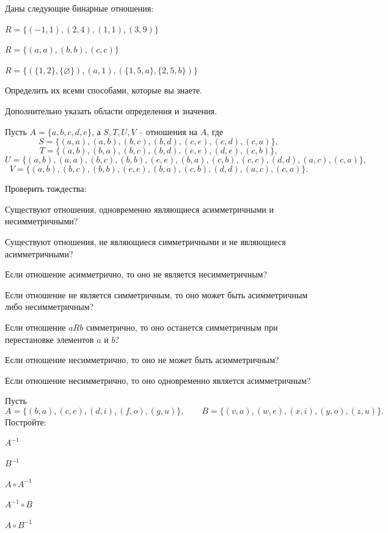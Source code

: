 \documentclass[a4paper,12pt,oneside]{article}
\begin{document}

Даны следующие бинарные отношения:
\begin{numlist}
    \item $R=\{(-1,1),(2,4),(1,1),(3,9)\}$
    \item $R=\{(a,a),(b,b),(c,c)\}$
    \item $R=\bigl\{(\{1,2\},\{\varnothing\}),(a,1),(\{1,5,a\},\{2,5,b\})\bigr\}$
\end{numlist}
Определить их всеми способами, которые вы знаете.

Дополнительно указать области определения и значения.

Пусть $A=\{a,b,c,d,e\}$, а $S,T,U,V$ – отношения на $A$, где
\[
S=\{(a,a),(a,b),(b,c),(b,d),(c,e),(e,d),(c,a)\},
\]
\[
T=\{(a,b),(b,a),(b,c),(b,d),(e,e),(d,e),(c,b)\},
\]
\[
U=\{(a,b),(a,a),(b,c),(b,b),(e,e),(b,a),(c,b),(c,c),(d,d),(a,c),(c,a)\},
\]
\[
V=\{(a,b),(b,c),(b,b),(e,e),(b,a),(c,b),(d,d),(a,c),(c,a)\}.
\]

Проверить тождества:
\begin{numlist}
    \item Существуют отношения, одновременно являющиеся асимметричными и несимметричными?
    \item Существуют отношения, не являющиеся симметричными и не являющиеся асимметричными?
    \item Если отношение асимметрично, то оно не является несимметричным?
    \item Если отношение не является симметричным, то оно может быть асимметричным либо несимметричным?
    \item Если отношение $aRb$ симметрично, то оно останется симметричным при перестановке элементов $a$ и $b$?
    \item Если отношение несимметрично, то оно не может быть асимметричным?
    \item Если отношение несимметрично, то оно одновременно является асимметричным?
\end{numlist}

Пусть
\[
A=\{(b,a),(c,e),(d,i),(f,o),(g,u)\},\qquad
B=\{(v,a),(w,e),(x,i),(y,o),(z,u)\}.
\]
Постройте:
\begin{numlist}
    \item $A^{-1}$
    \item $B^{-1}$
    \item $A\circ A^{-1}$
    \item $A^{-1}\circ B$
    \item $A\circ B^{-1}$
\end{numlist}
\end{document}
